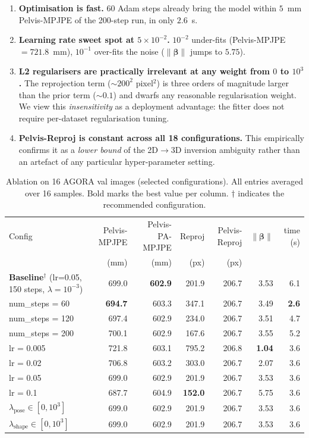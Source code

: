 \documentclass[conference]{IEEEtran}
\begin{document}
\begin{enumerate}
    \item \textbf{Optimisation is fast.} 60 Adam steps already bring the model within $5$~mm Pelvis-MPJPE of the 200-step run, in only $2.6$~s.
    \item \textbf{Learning rate sweet spot at $5\times10^{-2}$.} $10^{-2}$ under-fits (Pelvis-MPJPE $=721.8$~mm), $10^{-1}$ over-fits the noise ($\|\boldsymbol{\beta}\|$ jumps to $5.75$).
    \item \textbf{L2 regularisers are practically irrelevant at any weight from $0$ to $10^{3}$.} The reprojection term ($\sim\!\!200^2$ pixel$^2$) is three orders of magnitude larger than the prior term ($\sim\!\!0.1$) and dwarfs any reasonable regularisation weight. We view this \emph{insensitivity} as a deployment advantage: the fitter does not require per-dataset regularisation tuning.
    \item \textbf{Pelvis-Reproj is constant across all 18 configurations.} This empirically confirms it as a \emph{lower bound} of the 2D$\rightarrow$3D inversion ambiguity rather than an artefact of any particular hyper-parameter setting.
\end{enumerate}

\begin{table}[htbp]
\centering
\caption{Ablation on 16 AGORA val images (selected configurations). All entries averaged over 16 samples. Bold marks the best value per column. $\dagger$ indicates the recommended configuration.}
\label{tab:abl}
\small
\begin{tabular}{l r r r r r r}
\toprule
Config & Pelvis-MPJPE & Pelvis-PA-MPJPE & Reproj & Pelvis-Reproj & $\|\boldsymbol{\beta}\|$ & time (s) \\
 & (mm) & (mm) & (px) & (px) & & \\
\midrule
\textbf{Baseline}$^\dagger$ (lr=0.05, 150 steps, $\lambda\!=\!10^{-3}$) & 699.0 & \textbf{602.9} & 201.9 & 206.7 & 3.53 & 6.1 \\
num\_steps = 60  & \textbf{694.7} & 603.3 & 347.1 & 206.7 & 3.49 & \textbf{2.6} \\
num\_steps = 120 & 697.4 & 602.9 & 234.0 & 206.7 & 3.51 & 4.7 \\
num\_steps = 200 & 700.1 & 602.9 & 167.6 & 206.7 & 3.55 & 5.2 \\
lr = 0.005       & 721.8 & 603.1 & 795.2 & 206.8 & \textbf{1.04} & 3.6 \\
lr = 0.02        & 706.8 & 603.2 & 303.0 & 206.7 & 2.07 & 3.6 \\
lr = 0.05        & 699.0 & 602.9 & 201.9 & 206.7 & 3.53 & 3.6 \\
lr = 0.1         & 687.7 & 604.9 & \textbf{152.0} & 206.7 & 5.75 & 3.6 \\
$\lambda_{\text{pose}} \in [0,10^3]$ & 699.0 & 602.9 & 201.9 & 206.7 & 3.53 & 3.6 \\
$\lambda_{\text{shape}} \in [0,10^3]$ & 699.0 & 602.9 & 201.9 & 206.7 & 3.53 & 3.6 \\
\bottomrule
\end{tabular}
\end{table}
\end{document}
